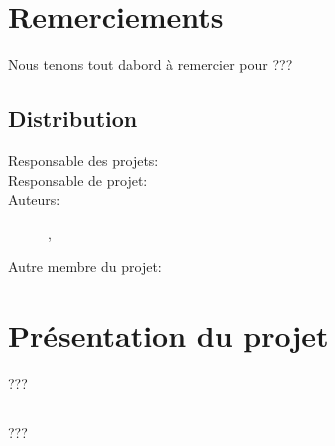 \documentclass[french]{report}
\begin{document}


\pagestyle{fancyplain}
\renewcommand{\chaptermark}[1]{\markboth{\chaptername\ \thechapter. #1}{}}
\renewcommand{\sectionmark}[1]{\markright{\thesection. #1}}
\lhead[]{\fancyplain{}{\bfseries\leftmark}}
\rhead[]{\fancyplain{}{\bfseries\thepage}}
\cfoot{}
% 
%
\chapter*{Remerciements}
Nous tenons tout dabord à remercier \civiliteResponsableProet{} \responsableProjet{} pour ???


\section*{Distribution}
\begin{description}
\item [Responsable des projets:] \responsableDesProjets
\item [Responsable de projet:] \responsableProjet
\item [Auteurs:] \etudiantJP, \etudiantRD
\item [Autre membre du projet:] \etudiantSL
\end{description}


\tableofcontents




\chapter{Présentation du projet}
???
\section{\pepit}
???
\end{document}
